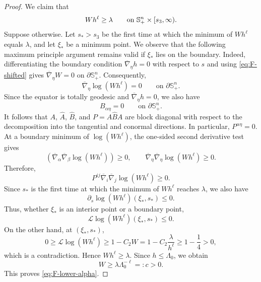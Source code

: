 \documentclass[11pt, reqno]{amsart}
\theoremstyle{remark}
\theoremstyle{definition}
\numberwithin{equation}{section}
\newcommand{\Sph}{\mathbb S}
\begin{document}
\begin{proof}
We claim that
\begin{equation*}
        Wh^\ell\ge\lambda
        \qquad\hbox{on }\Sph^n_+\times[s_3,\infty).
\end{equation*}
Suppose otherwise.  Let $s_*>s_3$ be the first time at which the minimum of
$Wh^\ell$ equals $\lambda$, and let $\xi_*$ be a minimum point.  
We observe that the following maximum principle argument remains
valid if $\xi_*$ lies on the boundary. Indeed, differentiating the
boundary condition $\overline{\nabla}_{\eta}h=0$ with respect to $s$
and using \eqref{eq:F-shifted}  
gives $\overline{\nabla}_{\eta}W=0$ on $\partial\mathbb S^n_+$.
Consequently,
\begin{equation*}
    \overline{\nabla}_{\eta}\log(Wh^\ell)=0
    \qquad\text{on }\partial\mathbb S^n_+.
\end{equation*}
Since the equator is totally geodesic and
$\overline{\nabla}_{\eta}h=0$, we also have
\begin{equation*}
    B_{\alpha\eta}=0
    \qquad\text{on }\partial\mathbb S^n_+.
\end{equation*}
It follows that $A$, $\widehat A$, $\widehat B$, and
$P=A\widehat BA$ are block diagonal with respect to the decomposition
into the tangential and conormal directions. In particular, $P^{\alpha\eta}=0$. 
At a boundary minimum of $\log(Wh^\ell)$, the one-sided second derivative
test gives
\begin{equation*}
    \left(\overline{\nabla}_{\alpha}
    \overline{\nabla}_{\beta}\log(Wh^\ell)\right)\geq0,
    \qquad
    \overline{\nabla}_{\eta}
    \overline{\nabla}_{\eta}\log(Wh^\ell)\geq0.
\end{equation*}
Therefore,
\begin{equation*}
    P^{ij}\overline{\nabla}_i
    \overline{\nabla}_j\log(Wh^\ell)\geq0.
\end{equation*}
Since $s_*$ is the first time at which the minimum of $Wh^\ell$
reaches $\lambda$, we also have
\begin{equation*}
    \partial_s\log(Wh^\ell)(\xi_*,s_*)\leq0.
\end{equation*}
Thus, whether $\xi_*$ is an interior point or a boundary point,
\begin{equation*}
    \mathcal L\log(Wh^\ell)(\xi_*,s_*)\leq0.
\end{equation*}
On the other hand, at $(\xi_*,s_*)$,
\begin{equation*}
    0
    \geq \mathcal L\log(Wh^\ell)
    \geq 1-C_2W
    =1-C_2\frac{\lambda}{h^\ell}
    \geq 1-\frac14
    >0,
\end{equation*}
which is a contradiction. Hence $Wh^\ell\ge\lambda$.  Since $h\le\Lambda_0$,
we obtain
\begin{equation*}
        W\ge \lambda\Lambda_0^{-\ell}=:c>0.
\end{equation*}
This proves \eqref{eq:F-lower-alpha}.
\end{proof}
\end{document}
